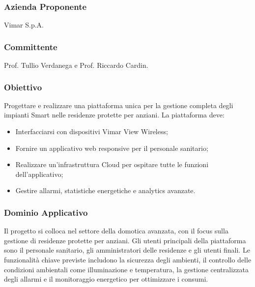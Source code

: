 \documentclass[a4paper,12pt]{article}
\begin{document}
\subsubsection*{Azienda Proponente}
Vimar S.p.A.

\subsubsection*{Committente}
Prof. Tullio Verdanega e Prof. Riccardo Cardin.

\subsubsection*{Obiettivo}
Progettare e realizzare una piattaforma unica per la gestione completa degli impianti Smart nelle residenze protette per anziani. La piattaforma deve:
\begin{itemize}
    \item Interfacciarsi con dispositivi Vimar View Wireless;
    \item Fornire un applicativo web responsive per il personale sanitario;
    \item Realizzare un’infrastruttura Cloud per ospitare tutte le funzioni dell’applicativo;
    \item Gestire allarmi, statistiche energetiche e analytics avanzate.
\end{itemize}

\subsubsection*{Dominio Applicativo}
Il progetto si colloca nel settore della domotica avanzata, con il focus sulla gestione di residenze protette per anziani. Gli utenti principali della piattaforma sono il personale sanitario, gli amministratori delle residenze e gli utenti finali. Le funzionalità chiave previste includono la sicurezza degli ambienti, il controllo delle condizioni ambientali come illuminazione e temperatura, la gestione centralizzata degli allarmi e il monitoraggio energetico per ottimizzare i consumi.
\end{document}
